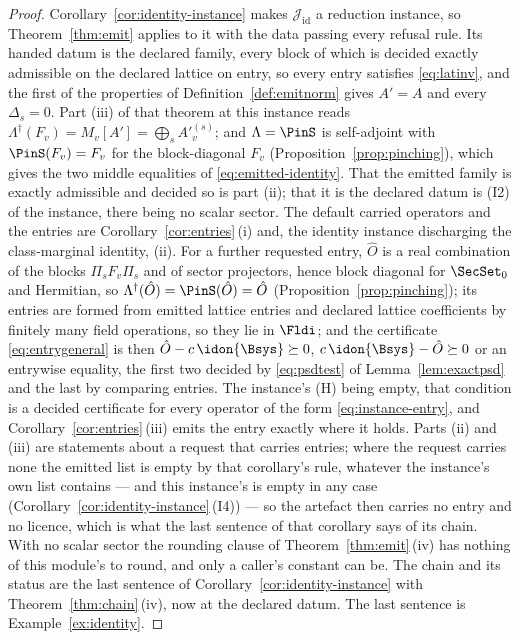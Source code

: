 \begin{proof}
Corollary~\ref{cor:identity-instance} makes $\mathcal{J}_{\mathrm{id}}$ a
reduction instance, so Theorem~\ref{thm:emit} applies to it with the data
passing every refusal rule. Its handed datum is the declared family, every
block of which is decided exactly admissible on the declared lattice on
entry, so every entry satisfies \eqref{eq:latinv}, and the first of the
properties of Definition~\ref{def:emitnorm} gives $A'=A$ and every
$\Delta_s=0$. Part (iii) of that theorem at this instance reads
$\Lambda^{\dagger}(F_v)=M_v[A']=\bigoplus_sA'^{(s)}_v$; and $\Lambda=\PinS$ is
self-adjoint with $\PinS(F_v)=F_v$ for the block-diagonal $F_v$
(Proposition~\ref{prop:pinching}), which gives the two middle equalities of
\eqref{eq:emitted-identity}. That the emitted family is exactly admissible
and decided so is part (ii); that it is the declared datum is (I2) of the
instance, there being no scalar sector. The default carried operators and
the entries are Corollary~\ref{cor:entries}\,(i) and, the identity instance
discharging the class-marginal identity, (ii). For a further requested
entry, $\hat O$ is a real combination of the blocks $\Pi_sF_v\Pi_s$ and of
sector projectors, hence block diagonal for $\SecSet_0$ and Hermitian, so
$\Lambda^{\dagger}(\hat O)=\PinS(\hat O)=\hat O$ (Proposition~\ref{prop:pinching});
its entries are formed from emitted lattice entries and declared lattice
coefficients by finitely many field operations, so they lie in $\Fldi$; and
the certificate \eqref{eq:entrygeneral} is then $\hat O-c\,\idon{\Bsys}\succeq0$,
$c\,\idon{\Bsys}-\hat O\succeq0$ or an entrywise equality, the first two
decided by \eqref{eq:psdtest} of Lemma~\ref{lem:exactpsd} and the last by
comparing entries. The instance's (H) being empty, that condition is a decided
certificate for every operator of the form \eqref{eq:instance-entry}, and
Corollary~\ref{cor:entries}\,(iii) emits the entry exactly where it holds.
Parts (ii) and (iii) are statements
about a request that carries entries; where the request carries none the
emitted list is empty by that corollary's rule, whatever the instance's own
list contains --- and this instance's is empty in any case
(Corollary~\ref{cor:identity-instance}\,(I4)) --- so the artefact then
carries no entry and no licence, which is what the last sentence of that
corollary says of its chain. With no scalar sector the rounding clause of
Theorem~\ref{thm:emit}\,(iv) has nothing of this module's to round, and only
a caller's constant can be. The chain and its status are the last sentence
of Corollary~\ref{cor:identity-instance} with Theorem~\ref{thm:chain}\,(iv),
now at the declared datum. The last sentence is
Example~\ref{ex:identity}.
\end{proof}
